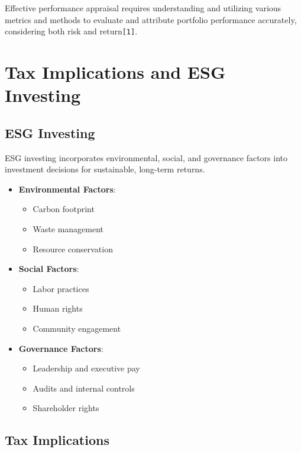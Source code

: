 \documentclass[
]{book}
\providecommand{\tightlist}{%
  \setlength{\itemsep}{0pt}\setlength{\parskip}{0pt}}
\begin{document}
Effective performance appraisal requires understanding and utilizing
various metrics and methods to evaluate and attribute portfolio
performance accurately, considering both risk and
return\texttt{{[}1{]}}.

\hypertarget{ch9}{%
\chapter{Tax Implications and ESG Investing}\label{ch9}}

\hypertarget{esg-investing}{%
\section{ESG Investing}\label{esg-investing}}

ESG investing incorporates environmental, social, and governance factors
into investment decisions for sustainable, long-term returns.

\begin{itemize}
\tightlist
\item
  \textbf{Environmental Factors}:

  \begin{itemize}
  \tightlist
  \item
    Carbon footprint
  \item
    Waste management
  \item
    Resource conservation
  \end{itemize}
\item
  \textbf{Social Factors}:

  \begin{itemize}
  \tightlist
  \item
    Labor practices
  \item
    Human rights
  \item
    Community engagement
  \end{itemize}
\item
  \textbf{Governance Factors}:

  \begin{itemize}
  \tightlist
  \item
    Leadership and executive pay
  \item
    Audits and internal controls
  \item
    Shareholder rights
  \end{itemize}
\end{itemize}

\hypertarget{tax-implications}{%
\section{Tax Implications}\label{tax-implications}}
\end{document}
